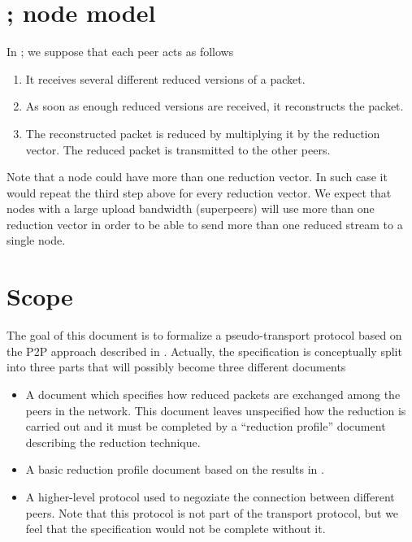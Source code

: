 \documentclass{rfc}
\begin{document}
\section{\ppmtp; node model}
\label{sub:3.2;transport_layer}

In \ppmtp; we suppose that each peer acts as follows
%
\begin{enumerate}
  \item
     It receives several different reduced versions of a packet.  
  \item
     As soon as enough reduced versions are received, it reconstructs the
     packet. 
  \item
     The reconstructed packet is reduced by multiplying it by the
     reduction vector.  The reduced packet is transmitted to the other
     peers.  
\end{enumerate}
%
Note that a node could have more than one reduction vector.  In such
case it would repeat the third step above for every reduction
vector. We expect that nodes with a large upload bandwidth
(superpeers) will use more than one reduction vector in order to be
able to send more than one reduced stream to a single node.

\section{Scope}
\label{sub:3.1;transport_layer}

The goal of this document is to formalize a pseudo-transport protocol
based on the P2P approach described in \cite{bernardini08:dcc08}.
Actually, the specification is conceptually split into three parts
that will possibly become three different documents

\begin{itemize}
\item
A document which specifies how reduced packets are exchanged among the
peers in the network.  This document leaves unspecified how the
reduction is carried out and it must be completed by a ``reduction
profile'' document describing the reduction technique.
\item
A basic reduction profile document based on the results in
\cite{bernardini08:dcc08}.
\item
A higher-level protocol used to negoziate the connection between
different peers.  Note that this protocol is not part of the
transport protocol, but we feel that the specification would not be
complete without it.
\end{itemize}
%
\end{document}
